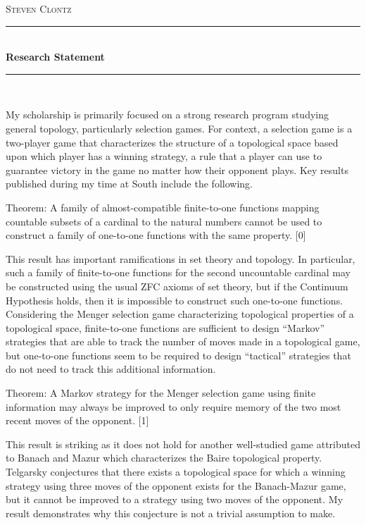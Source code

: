 \documentclass[11pt]{amsart}
\theoremstyle{plain}
\newcommand{\HRule}{\rule{\linewidth}{0.5mm}}
\newcommand{\<}{\langle}
\renewcommand{\>}{\rangle}
\begin{document}
\begin{center}

\textsc{\huge Steven Clontz}

\HRule \\[0.1cm]
{ \huge \bfseries Research Statement \\[0.4cm] }

\HRule \\[1.5cm]

\end{center}


My scholarship is primarily focused on a strong research program studying general topology,
particularly selection games. 
For context, a selection game is a two-player game that
characterizes the structure of a topological space based upon which player has a
winning strategy, a rule that a player can use to guarantee victory in the game
no matter how their opponent plays.
Key results published during my time at South
include the following. 

Theorem: A family of almost-compatible finite-to-one functions
mapping countable subsets of a cardinal
to the natural numbers cannot be used to construct a family of one-to-one
functions with the same property. [0]

This result has important ramifications in set theory and topology. In particular,
such a family of finite-to-one functions for the second uncountable cardinal
may be constructed using the usual ZFC axioms of 
set theory, but if the Continuum Hypothesis holds,
then it is impossible to construct such one-to-one functions. Considering the Menger
selection game characterizing topological properties of a topological space,
finite-to-one functions
are sufficient to design ``Markov'' strategies that are able to track the number of moves
made in a topological game, but one-to-one functions seem to be required to design
``tactical'' strategies that do not need to track this additional information.

Theorem: A Markov strategy for the Menger selection game using finite information 
may always be improved
to only require memory of the two most recent moves of the opponent. [1] 

This result is striking as it does not hold for another well-studied game
attributed to Banach and Mazur which characterizes the Baire topological property.
Telgarsky conjectures that there exists a topological space for which a winning
strategy using three moves of the opponent exists for the Banach-Mazur game, 
but it cannot be
improved to a strategy using two moves of the opponent. My result demonstrates
why this conjecture is not a trivial assumption to make. 
\end{document}
